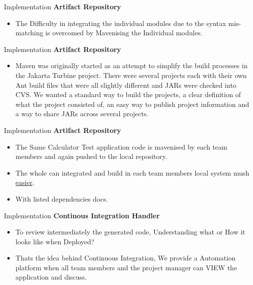 \documentclass{beamer}
\begin{document}
\begin{frame}{Implementation}
	\textbf{Artifact Repository}
	\begin{itemize}
		\item The Difficulty in integrating the individual modules due to the syntax mis-matching is overcomed by 
	    Mavenising the Individual modules.
		
		
	\end{itemize}	
\end{frame}






\begin{frame}{Implementation}
	\textbf{Artifact Repository}
	\begin{itemize}
		
		
		
		
		\item Maven was originally started as an attempt to simplify the build processes in the Jakarta Turbine project. There were several projects each with their own Ant build files that were all slightly different and JARs were checked into CVS. We wanted a standard way to build the projects, a clear definition of what the project consisted of, an easy way to publish project information and a way to share JARs across several projects.
		
	\end{itemize}	
\end{frame}


\begin{frame}{Implementation}
	\textbf{Artifact Repository}
	\begin{itemize}
		
		\item The Same Calculator Test application code is mavenised by each team members and again pushed to the local repository.
		\vspace{0.05cm}
		\item The whole can integrated and build in each team members local system mush \underline{easier}. 
		\vspace{0.05cm}
		\item With listed dependencies docs.
	\end{itemize}	
\end{frame}

\begin{frame}{Implementation}
	\textbf{Continous Integration Handler}
	\begin{itemize}
		
		\item To review intermediately the generated code, Understanding what or How it looks like when Deployed?
		\vspace{0.05cm}
		\item Thats the idea behind Continuous Integration, We provide a Automation platform when all team members and the project manager can VIEW the application and discuss.
		  
		
	\end{itemize}	
\end{frame}
\end{document}
